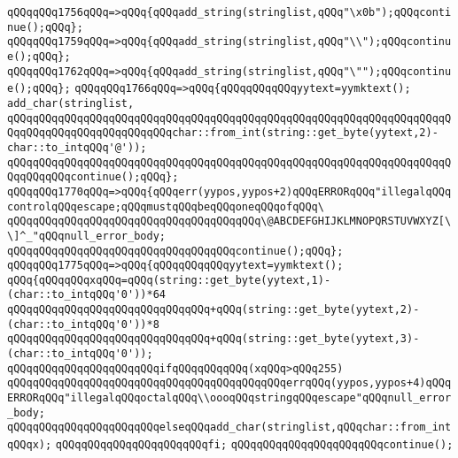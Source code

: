 \verb|qQQqqQQq1756qQQq=>qQQq{qQQqadd_string(stringlist,qQQq"\x0b");qQQqcontinue();qQQq};|\newline
\verb|qQQqqQQq1759qQQq=>qQQq{qQQqadd_string(stringlist,qQQq"\\");qQQqcontinue();qQQq};|\newline
\verb|qQQqqQQq1762qQQq=>qQQq{qQQqadd_string(stringlist,qQQq"\"");qQQqcontinue();qQQq};|\newline
\verb|qQQqqQQq1766qQQq=>qQQq{qQQqqQQqqQQqyytext=yymktext();|\newline
\verb|add_char(stringlist,|\newline
\verb|qQQqqQQqqQQqqQQqqQQqqQQqqQQqqQQqqQQqqQQqqQQqqQQqqQQqqQQqqQQqqQQqqQQqqQQqqQQqqQQqqQQqqQQqqQQqqQQqchar::from_int(string::get_byte(yytext,2)-char::to_intqQQq'@'));|\newline
\verb|qQQqqQQqqQQqqQQqqQQqqQQqqQQqqQQqqQQqqQQqqQQqqQQqqQQqqQQqqQQqqQQqqQQqqQQqqQQqqQQqcontinue();qQQq};|\newline
\verb|qQQqqQQq1770qQQq=>qQQq{qQQqerr(yypos,yypos+2)qQQqERRORqQQq"illegalqQQqcontrolqQQqescape;qQQqmustqQQqbeqQQqoneqQQqofqQQq\|\newline
\verb|qQQqqQQqqQQqqQQqqQQqqQQqqQQqqQQqqQQqqQQq\@ABCDEFGHIJKLMNOPQRSTUVWXYZ[\\]^_"qQQqnull_error_body;|\newline
\verb|qQQqqQQqqQQqqQQqqQQqqQQqqQQqqQQqqQQqcontinue();qQQq};|\newline
\verb|qQQqqQQq1775qQQq=>qQQq{qQQqqQQqqQQqyytext=yymktext();|\newline
\verb|qQQq{qQQqqQQqxqQQq=qQQq(string::get_byte(yytext,1)-(char::to_intqQQq'0'))*64|\newline
\verb|qQQqqQQqqQQqqQQqqQQqqQQqqQQqqQQq+qQQq(string::get_byte(yytext,2)-(char::to_intqQQq'0'))*8|\newline
\verb|qQQqqQQqqQQqqQQqqQQqqQQqqQQqqQQq+qQQq(string::get_byte(yytext,3)-(char::to_intqQQq'0'));|\newline
\verb|qQQqqQQqqQQqqQQqqQQqqQQqifqQQqqQQqqQQq(xqQQq>qQQq255)|\newline
\verb|qQQqqQQqqQQqqQQqqQQqqQQqqQQqqQQqqQQqqQQqqQQqerrqQQq(yypos,yypos+4)qQQqERRORqQQq"illegalqQQqoctalqQQq\\oooqQQqstringqQQqescape"qQQqnull_error_body;|\newline
\verb|qQQqqQQqqQQqqQQqqQQqqQQqelseqQQqadd_char(stringlist,qQQqchar::from_intqQQqx);|\newline
\verb|qQQqqQQqqQQqqQQqqQQqqQQqfi;|\newline
\verb|qQQqqQQqqQQqqQQqqQQqqQQqcontinue();|\newline
